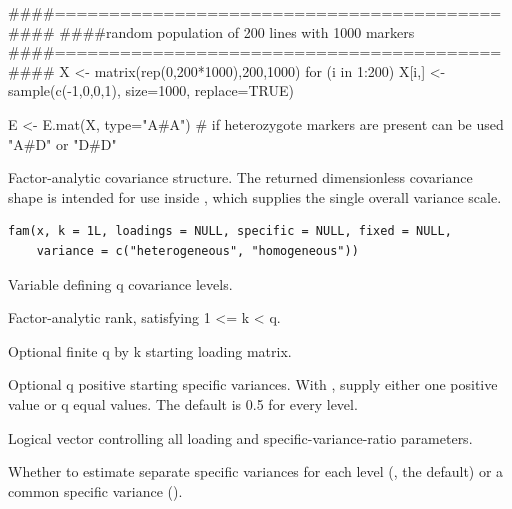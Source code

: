 \documentclass[a4paper]{book}
\begin{document}
%
\begin{Examples}
\begin{ExampleCode}
####=========================================####
####random population of 200 lines with 1000 markers
####=========================================####
X <- matrix(rep(0,200*1000),200,1000)
for (i in 1:200) {
  X[i,] <- sample(c(-1,0,0,1), size=1000, replace=TRUE)
}

E <- E.mat(X, type="A#A") 
# if heterozygote markers are present can be used "A#D" or "D#D"
\end{ExampleCode}
\end{Examples}
%
\begin{Description}\relax
Factor-analytic covariance structure. The returned dimensionless covariance shape is intended for use inside , which supplies the single overall variance scale.
\end{Description}
%
\begin{Usage}
\begin{verbatim}
fam(x, k = 1L, loadings = NULL, specific = NULL, fixed = NULL,
    variance = c("heterogeneous", "homogeneous"))
\end{verbatim}
\end{Usage}
%
\begin{Arguments}
\begin{ldescription}
\item[\code{x}] Variable defining q covariance levels.
\item[\code{k}] Factor-analytic rank, satisfying 1 <= k < q.
\item[\code{loadings}] Optional finite q by k starting loading matrix.
\item[\code{specific}] Optional q positive starting specific variances. With
, supply either one positive value or q equal
values. The default is 0.5 for every level.
\item[\code{fixed}] Logical vector controlling all loading and specific-variance-ratio parameters.
\item[\code{variance}] Whether to estimate separate specific variances for each level
(, the default) or a common specific variance
().
\end{ldescription}
\end{Arguments}
%
\end{document}
